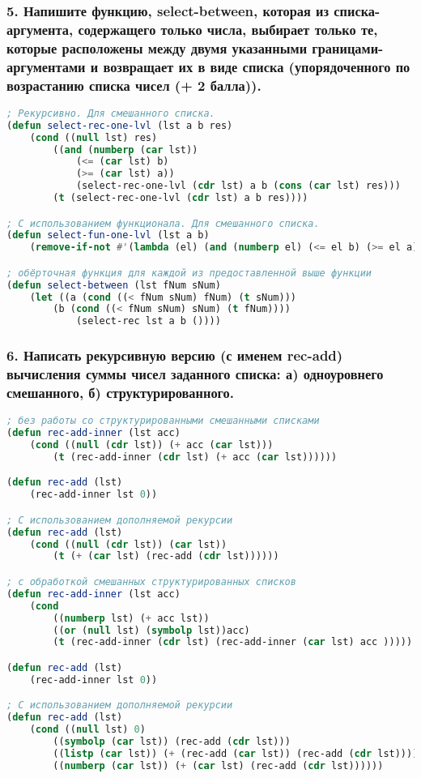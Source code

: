 \subsubsection*{5. Напишите функцию, select-between, которая из списка-аргумента, содержащего только числа, выбирает только те, которые расположены между двумя указанными границами-аргументами и возвращает их в виде списка (упорядоченного по возрастанию списка чисел (+ 2 балла)).}
\begin{lstlisting}[language=Lisp]
; Рекурсивно. Для смешанного списка.	
(defun select-rec-one-lvl (lst a b res)
	(cond ((null lst) res)
		((and (numberp (car lst)) 
			(<= (car lst) b) 
			(>= (car lst) a)) 
			(select-rec-one-lvl (cdr lst) a b (cons (car lst) res)))
		(t (select-rec-one-lvl (cdr lst) a b res))))

; С использованием функционала. Для смешанного списка.
(defun select-fun-one-lvl (lst a b)
	(remove-if-not #'(lambda (el) (and (numberp el) (<= el b) (>= el a))) lst))

; обёрточная функция для каждой из предоставленной выше функции
(defun select-between (lst fNum sNum)
	(let ((a (cond ((< fNum sNum) fNum) (t sNum)))
		(b (cond ((< fNum sNum) sNum) (t fNum))))
			(select-rec lst a b ()))) 
\end{lstlisting}

\newpage
\subsubsection*{6.  Написать рекурсивную версию (с именем rec-add) вычисления суммы чисел заданного списка: \newline а) одноуровнего смешанного, \newline б) структурированного.}
\begin{lstlisting}[language=Lisp]
; без работы со структурированными смешанными списками
(defun rec-add-inner (lst acc)
	(cond ((null (cdr lst)) (+ acc (car lst)))
		(t (rec-add-inner (cdr lst) (+ acc (car lst))))))

(defun rec-add (lst)
	(rec-add-inner lst 0))

; С использованием дополняемой рекурсии
(defun rec-add (lst)
	(cond ((null (cdr lst)) (car lst))
		(t (+ (car lst) (rec-add (cdr lst))))))

; с обработкой смешанных структурированных списков
(defun rec-add-inner (lst acc)
	(cond
		((numberp lst) (+ acc lst))
		((or (null lst) (symbolp lst))acc)
		(t (rec-add-inner (cdr lst) (rec-add-inner (car lst) acc )))))

(defun rec-add (lst)
	(rec-add-inner lst 0))

; С использованием дополняемой рекурсии
(defun rec-add (lst)
	(cond ((null lst) 0)
		((symbolp (car lst)) (rec-add (cdr lst)))
		((listp (car lst)) (+ (rec-add (car lst)) (rec-add (cdr lst))))
		((numberp (car lst)) (+ (car lst) (rec-add (cdr lst))))))
\end{lstlisting}


